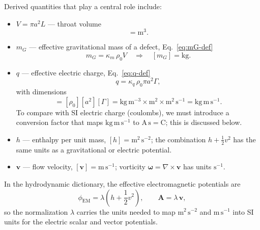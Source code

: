 \documentclass[11pt]{article}
\begin{document}
Derived quantities that play a central role include:

\begin{itemize}
  \item $V = \pi a^2 L$ --- throat volume
    \begin{equation}
    [V] = \mathrm{m^3}.
    \end{equation}

  \item $m_G$ --- effective gravitational mass of a defect, Eq.~\eqref{eq:mG-def}
    \begin{equation}
    m_G = \kappa_m\,\rho_0 V
    \quad\Rightarrow\quad
    [m_G] = \mathrm{kg}.
    \end{equation}

  \item $q$ --- effective electric charge, Eq.~\eqref{eq:q-def}
    \begin{equation}
    q = \kappa_q\,\rho_0 \pi a^2 \Gamma,
    \end{equation}
    with dimensions
    \begin{equation}
    [q] = [\rho_0][a^2][\Gamma]
        = \mathrm{kg\,m^{-3}}\times\mathrm{m^2}\times\mathrm{m^2\,s^{-1}}
        = \mathrm{kg\,m\,s^{-1}}.
    \end{equation}
    To compare with SI electric charge (coulombs), we must introduce a conversion factor that maps $\mathrm{kg\,m\,s^{-1}}$ to $\mathrm{A\,s} = \mathrm{C}$; this is discussed below.

  \item $h$ --- enthalpy per unit mass, $[h] = \mathrm{m^2\,s^{-2}}$;
        the combination $h + \frac{1}{2}v^2$ has the same units as a gravitational or electric potential.

  \item $\mathbf{v}$ --- flow velocity, $[\mathbf{v}] = \mathrm{m\,s^{-1}}$;
        vorticity $\boldsymbol{\omega} = \nabla\times\mathbf{v}$ has units $\mathrm{s^{-1}}$.
\end{itemize}

In the hydrodynamic dictionary, the effective electromagnetic potentials are
\begin{equation}
\phi_{\mathrm{EM}} = \lambda\left(h + \frac{1}{2}v^2\right),
\qquad
\mathbf{A} = \lambda\,\mathbf{v},
\end{equation}
so the normalization $\lambda$ carries the units needed to map $\mathrm{m^2\,s^{-2}}$ and $\mathrm{m\,s^{-1}}$ into SI units for the electric scalar and vector potentials.
\end{document}
